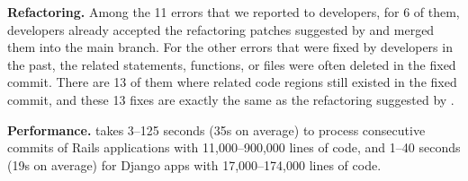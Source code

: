 
\textbf{Refactoring.} Among the 11 errors that we reported to developers, for 6
of them, developers already accepted the refactoring patches suggested by
\Tool and merged them into the main branch. For the other \numFixed errors that
were fixed by developers in the past, the related statements, functions, or files were
often deleted in the fixed commit. 
There are 13
of them where related code regions still existed in the fixed commit, and these 13 fixes are 
exactly the same as the refactoring suggested by \Tool. 


 


\textbf{Performance.}
 \Tool{} takes 3--125 seconds (35s on average) to process consecutive commits of Rails applications with 11,000--900,000 lines of code, and 1--40 seconds (19s on average) for Django apps with 17,000--174,000 lines of code.  

